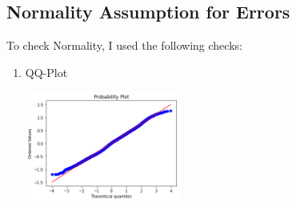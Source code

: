 \documentclass[12pt]{article}
\begin{document}
\subsection*{Normality Assumption for Errors}
To check Normality, I used the following checks:
\begin{enumerate}
	\item QQ-Plot\\
	\begin{center}
		\includegraphics[width=2in]{qq_plot_linear_model}
	\end{center}
\end{enumerate}
\end{document}
